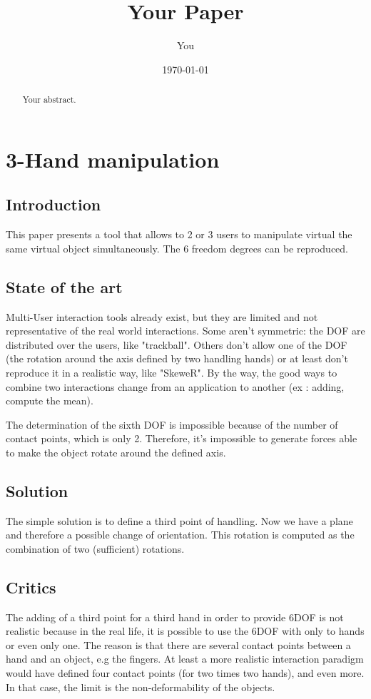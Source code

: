 \documentclass[a4paper]{article}
\title{Your Paper}
\author{You}
\date{\today}
\begin{document}
\maketitle

\begin{abstract}
Your abstract.
\end{abstract}

\section{3-Hand manipulation}

\subsection{Introduction}

This paper presents a tool that allows to 2 or 3 users to manipulate virtual the same virtual object simultaneously. The 6 freedom degrees can be reproduced.

\subsection{State of the art}

Multi-User interaction tools already exist, but they are limited and not representative of the real world interactions. Some aren't symmetric: the DOF are distributed over the users, like "trackball". Others don't allow one of the DOF (the rotation around the axis defined by two handling hands) or at least don't reproduce it in a realistic way, like "SkeweR". By the way, the good ways to combine two interactions change from an application to another (ex : adding, compute the mean).

The determination of the sixth DOF is impossible because of the number of contact points, which is only 2. Therefore, it's impossible to generate forces able to make the object rotate around the defined axis.

\subsection{Solution}

The simple solution is to define a third point of handling. Now we have a plane and therefore a possible change of orientation. This rotation is computed as the combination of two (sufficient) rotations.

\subsection{Critics}
The adding of a third point for a third hand in order to provide 6DOF is not realistic because in the real life, it is possible to use the 6DOF with only to hands or even only one. The reason is that there are several contact points between a hand and an object, e.g the fingers.
At least a more realistic interaction paradigm would have defined four contact points (for two times two hands), and even more. In that case, the limit is the non-deformability of the objects.
\end{document}
